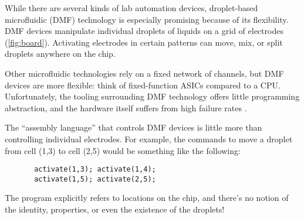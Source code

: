 \documentclass[
  10pt,
  a4paper,
  twocolumn,
]{article}
\begin{document}
While there are several kinds of lab automation devices,
droplet-based microfluidic (DMF) technology is especially promising because of its flexibility.
DMF devices manipulate individual droplets of liquids on a grid of electrodes (\autoref{fig:board}).
Activating electrodes in certain patterns can move, mix, or split droplets anywhere on the chip.

Other microfluidic technologies rely on a fixed network of channels, but DMF
devices are more flexible: think of fixed-function ASICs compared to a CPU.
Unfortunately, the tooling surrounding DMF technology offers little programming abstraction,
and the hardware itself suffers from high failure rates \cite{dmf-review}.

The ``assembly language'' that controls DMF devices is little more than controlling individual electrodes.
For example, the commands to move a droplet from cell (1,3) to cell (2,5) would be something like the following:

\begin{verbatim}
       activate(1,3); activate(1,4);
       activate(1,5); activate(2,5);
\end{verbatim}

The program explicitly refers to locations on the chip, and there's no notion of the identity, properties, or even the existence of the droplets!
\end{document}
